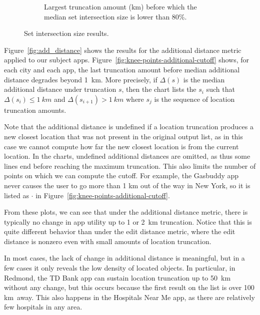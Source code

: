\documentclass[10pt, conference, compsocconf]{IEEEtran}
\newcommand{\comment}[3][\color{red}]{{#1{[{#2}: {#3}]}}}
\newcommand{\jeff}[1]{\comment[\color{green}]{JSF}{#1}}
\begin{document}
{\begin{figure}
\begin{subfigure}{\textwidth}
\begin{tabular}{|l||r|r|r|r|r|r|}
\end{tabular}
 \caption{Largest truncation amount (km) before which the median set
   intersection size is lower than 80\%.}
 \label{fig:knee-points-set-cutoff}
  \end{subfigure}
  
  \caption{Set intersection size results.}
\end{figure}


Figure~\ref{fig:add_distance} shows the results for the additional
distance metric applied to our subject apps.
Figure~\ref{fig:knee-points-additional-cutoff} shows, for each city
and each app, the last truncation amount before median additional
distance degrades beyond 1~km. More precisely, if $\Delta(s)$ is the
median additional distance under truncation $s$, then the chart lists
the $s_i$ such that $\Delta(s_i) \leq 1~km$ and $\Delta(s_{i+1}) >
1~km$ where $s_j$ is the sequence of location truncation amounts.

Note that the additional distance is undefined if a location
truncation produces a new closest location that was not present in the
original output list, as in this case we cannot compute how far the
new closest location is from the current location. In the charts,
undefined additional distances are omitted, as thus some lines end
before reaching the maximum truncation. This also limits the number of
points on which we can compute the cutoff.  For example, the Gasbuddy
app never causes the user to go more than 1 km out of the way in New York, 
so it is listed as $\cdot$ in Figure~\ref{fig:knee-points-additional-cutoff}.

From these plots, we can see that under the additional distance
metric, there is typically no change in app utility up to 1 or 2~km
truncation. Notice that this is
quite different behavior than under the edit distance metric,
where the edit distance is nonzero even with small amounts of 
location truncation.


In most cases, the lack of change in additional distance is
meaningful, but in a few cases it only reveals the low density of
located objects. In particular, in Redmond, the TD Bank app can
sustain location truncation up to 50~km without any change, but
this occurs because the first result on the list is over 100 km~away. This
also happens in the Hospitals Near Me app, as there are relatively few
hospitals in any area.

}
\end{document}
